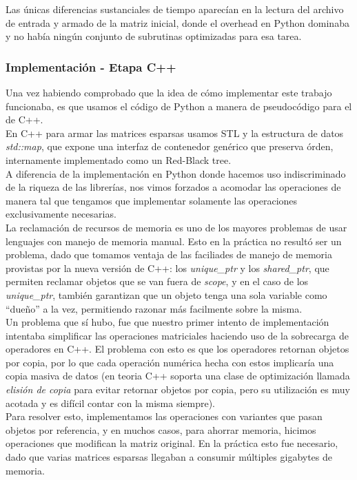 Las únicas diferencias sustanciales de tiempo aparecían en la lectura del archivo de entrada
y armado de la matriz inicial, donde el overhead en Python dominaba y no había
ningún conjunto de subrutinas optimizadas para esa tarea.

\subsubsection{Implementación - Etapa C++} %
\label{ssub:implementaci_n_etapa_c_}

Una vez habiendo comprobado que la idea de cómo implementar este trabajo
funcionaba, es que usamos el código de Python a manera de pseudocódigo para el de C++.\\

En C++ para armar las matrices esparsas usamos STL y la estructura de datos
\textit{std::map}, que expone una interfaz de contenedor genérico que preserva órden, internamente
implementado como un Red-Black tree.\\

A diferencia de la implementación en Python donde hacemos uso indiscriminado
de la riqueza de las librerías, nos vimos forzados a acomodar las operaciones
de manera tal que tengamos que implementar solamente las operaciones exclusivamente necesarias.\\

La reclamación de recursos de memoria es uno de los mayores problemas de usar
lenguajes con manejo de memoria manual. Esto en la práctica no resultó ser un problema,
dado que tomamos ventaja de las faciliades de manejo de memoria provistas por la nueva versión
de C++: los \textit{unique\_ptr} y los \textit{shared\_ptr}, que permiten reclamar objetos que se van fuera de
\textit{scope}, y en el caso de los \textit{unique\_ptr}, también garantizan que un objeto tenga
una sola variable como ``dueño'' a la vez, permitiendo razonar más facilmente sobre la misma.\\

Un problema que sí hubo, fue que nuestro primer intento de implementación intentaba simplificar
las operaciones matriciales haciendo uso de la sobrecarga de operadores en C++. El problema
con esto es que los operadores retornan objetos por copia, por lo que cada operación numérica
hecha con estos implicaría una copia masiva de datos (en teoria C++ soporta una clase de optimización
llamada \textit{elisión de copia} para evitar retornar objetos por copia, pero su utilización es muy acotada y
es difícil contar con la misma siempre).\\

Para resolver esto, implementamos las operaciones con variantes que pasan objetos por referencia, y
en muchos casos, para ahorrar memoria, hicimos operaciones que modifican la matriz original. En la práctica
esto fue necesario, dado que varias matrices esparsas llegaban a consumir múltiples gigabytes de memoria.



